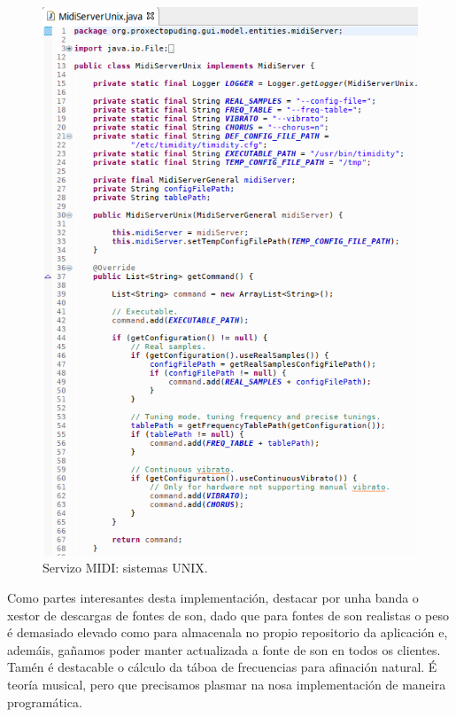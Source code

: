    \begin{figure}[htbp]
    \centering
    \includegraphics[scale=0.6, keepaspectratio=true]{./imagenes/timidity.png}
    \caption{Servizo MIDI: sistemas UNIX.}
    \label{figura:Timidity}
   \end{figure}
   
   Como partes interesantes desta implementación, destacar por unha banda o
   xestor de descargas de fontes de son, dado que para fontes de son realistas
   o peso é demasiado elevado como para almacenala no propio repositorio da
   aplicación e, ademáis, gañamos poder manter actualizada a fonte de son en
   todos os clientes. \\
   
   Tamén é destacable o cálculo da táboa de frecuencias para afinación natural.
   É teoría musical, pero que precisamos plasmar na nosa implementación de
   maneira programática. \\
   
